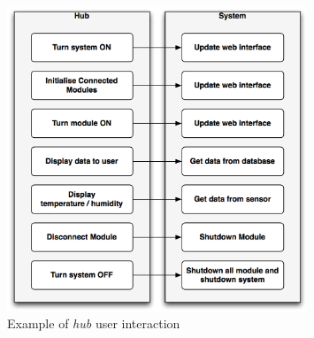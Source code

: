 \begin{figure}[H]
	\begin{centering}
		 \includegraphics[width=0.8\textwidth]{images/hub_int.png}
		\caption{Example of \textit{hub} user interaction}
	\end{centering}
\end{figure}
	

